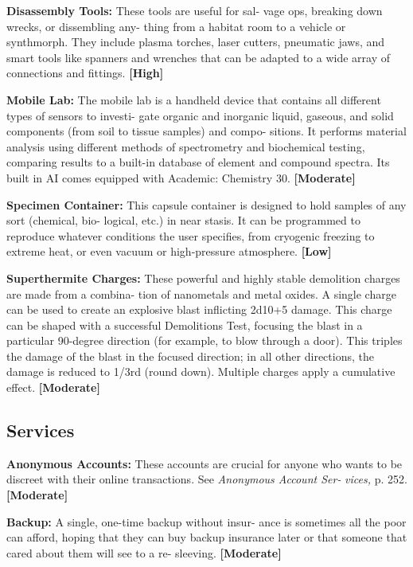 \textbf{Disassembly Tools:} These tools are useful for sal-
vage ops, breaking down wrecks, or dissembling any-
thing from a habitat room to a vehicle or synthmorph. 
They include plasma torches, laser cutters, pneumatic 
jaws, and smart tools like spanners and wrenches that 
can be adapted to a wide array of connections and 
fittings. \textbf{[High]}

\textbf{Mobile Lab: }The mobile lab is a handheld device 
that contains all different types of sensors to investi-
gate organic and inorganic liquid, gaseous, and solid 
components (from soil to tissue samples) and compo-
sitions. It performs material analysis using different 
methods of spectrometry and biochemical testing, 
comparing results to a built-in database of element 
and compound spectra. Its built in AI comes equipped 
with Academic: Chemistry 30. \textbf{[Moderate]}

\textbf{Specimen Container:} This capsule container is 
designed to hold samples of any sort (chemical, bio-
logical, etc.) in near stasis. It can be programmed to 
reproduce whatever conditions the user specifies, from 
cryogenic freezing to extreme heat, or even vacuum or 
high-pressure atmosphere. \textbf{[Low]}

\textbf{Superthermite Charges:} These powerful and highly 
stable demolition charges are made from a combina-
tion of nanometals and metal oxides. A single charge 
can be used to create an explosive blast inflicting 
2d10+5 damage. This charge can be shaped with a 
successful Demolitions Test, focusing the blast in a 
particular 90-degree direction (for example, to blow 
through a door). This triples the damage of the blast 
in the focused direction; in all other directions, the 
damage is reduced to 1/3rd (round down). Multiple 
charges apply a cumulative effect. \textbf{[Moderate]}

\subsection{Services}

\textbf{Anonymous Accounts:} These accounts are crucial 
for anyone who wants to be discreet with their 
online transactions. See \textit{Anonymous Account Ser-}
\textit{vices,} p. 252. \textbf{[Moderate]}

\textbf{Backup:} A single, one-time backup without insur-
ance is sometimes all the poor can afford, hoping 
that they can buy backup insurance later or that 
someone that cared about them will see to a re-
sleeving. \textbf{[Moderate]}

